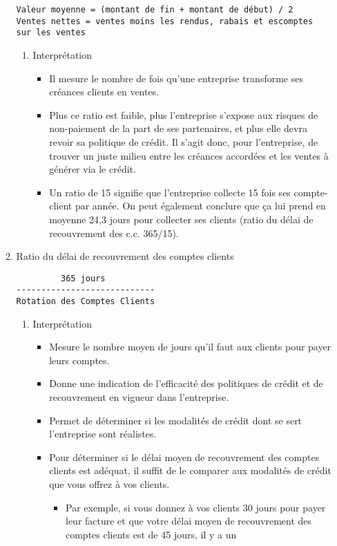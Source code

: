 \documentclass[11pt]{article}
\begin{document}
\begin{enumerate}
\begin{enumerate}
\begin{verbatim}
Valeur moyenne = (montant de fin + montant de début) / 2
Ventes nettes = ventes moins les rendus, rabais et escomptes sur les ventes
\end{verbatim}
\begin{enumerate}
\item Interprétation
\label{sec:org75eb312}
\begin{itemize}
\item Il mesure le nombre de fois qu’une entreprise transforme ses créances clients en
ventes.
\item Plus ce ratio est faible, plus l’entreprise s’expose aux risques de non-paiement de la
part de ses partenaires, et plus elle devra revoir sa politique de crédit. Il s’agit donc,
pour l’entreprise, de trouver un juste milieu entre les créances accordées et les ventes
à générer via le crédit.
\item Un ratio de 15 signifie que l’entreprise collecte 15 fois ses compte-client par année. On
peut également conclure que ça lui prend en moyenne 24,3 jours pour collecter ses
clients (ratio du délai de recouvrement des c.c. 365/15).
\end{itemize}
\end{enumerate}
\item Ratio du délai de recouvrement des comptes clients
\label{sec:orgd19c756}
\begin{verbatim}
         365 jours
----------------------------
Rotation des Comptes Clients
\end{verbatim}
\begin{enumerate}
\item Interprétation
\label{sec:orgf44fcbc}
\begin{itemize}
\item Mesure le nombre moyen de jours qu’il faut aux clients pour payer leurs comptes.
\item Donne une indication de l’efficacité des politiques de crédit et de recouvrement en
vigueur dans l’entreprise.
\item Permet de déterminer si les modalités de crédit dont se sert l’entreprise sont réalistes.
\item Pour déterminer si le délai moyen de recouvrement des comptes clients est adéquat, il
suffit de le comparer aux modalités de crédit que vous offrez à vos clients.
\begin{itemize}
\item Par exemple, si vous donnez à vos clients 30 jours pour payer leur facture et que
votre délai moyen de recouvrement des comptes clients est de 45 jours, il y a un

\end{itemize}
\end{itemize}
\end{enumerate}
\end{enumerate}
\end{enumerate}
\end{document}
